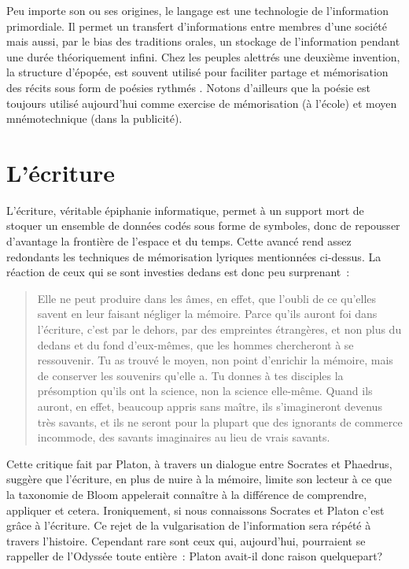Peu importe son ou ses origines, le langage est une technologie de l'information primordiale. Il permet un transfert d'informations entre membres d'une société mais aussi, par le bias des traditions orales, un stockage de l'information pendant une durée théoriquement infini. Chez les peuples alettrés une deuxième invention, la structure d'épopée, est souvent utilisé pour faciliter partage et mémorisation des récits sous form de poésies rythmés \cite{havelock-preface-plato}. Notons d'ailleurs que la poésie est toujours utilisé aujourd'hui comme exercise de mémorisation (à l'école) et moyen mnémotechnique (dans la publicité).

\section{L'écriture}
L'écriture, véritable épiphanie informatique, permet à un support mort de stoquer un ensemble de données codés sous forme de symboles, donc de repousser d'avantage la frontière de l'espace et du temps. Cette avancé rend assez redondants les techniques de mémorisation lyriques mentionnées ci-dessus. La réaction de ceux qui se sont investies dedans est donc peu surprenant~:
\begin{quote}
Elle ne peut produire dans les âmes, en effet, que l’oubli de ce qu’elles  savent en leur faisant négliger la mémoire. Parce qu’ils auront foi dans  l’écriture, c’est par le dehors, par des empreintes étrangères, et non plus du dedans et du fond d’eux-mêmes, que les hommes chercheront à se ressouvenir. Tu as trouvé le moyen, non point d’enrichir la mémoire, mais de conserver les souvenirs qu’elle a. Tu donnes à tes disciples la présomption qu’ils ont la science, non la science elle-même. Quand ils auront, en effet, beaucoup appris sans maître, ils s’imagineront devenus très savants, et ils ne seront pour la plupart que des ignorants de commerce incommode, des savants imaginaires au lieu de vrais savants.
\end{quote}
Cette critique fait par Platon\cite{plato-phaedrus}, à travers un dialogue entre Socrates et Phaedrus, suggère que l'écriture, en plus de nuire à la mémoire, limite son lecteur à ce que la taxonomie de Bloom\cite{tax-bloom} appelerait \og{}connaître\fg{} à la différence de \og{}comprendre\fg{}, \og{}appliquer\fg{} et cetera.
Ironiquement, si nous connaissons Socrates et Platon c'est grâce à l'écriture. Ce rejet de la vulgarisation de l'information sera répété à travers l'histoire. Cependant rare sont ceux qui, aujourd'hui, pourraient se rappeller de l'Odyssée toute entière~: Platon avait-il donc raison quelquepart? 

